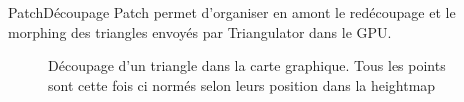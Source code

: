\documentclass[french]{beamer}
\begin{document}
 \begin{frame}{Patch}{Découpage}
 Patch permet d'organiser en amont le redécoupage et le morphing des triangles envoyés par Triangulator dans le GPU.
 \begin{figure}
\caption{Découpage d'un triangle dans la carte graphique. Tous les points sont cette fois ci normés selon leurs position dans la heightmap}

\centerline{
}
\end{figure}
\end{frame}
\end{document}
